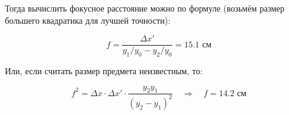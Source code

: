 \documentclass[a4paper,12pt]{article}
\theoremstyle{definition}
\begin{document}
Тогда вычислить фокусное расстояние можно по формуле (возьмём размер большего квадратика для лучшей точности):

\begin{equation*}
    f = \frac{\Delta x'}{y_1/y_0 - y_2/y_0} = 15.1 \text{ см}
\end{equation*}

Или, если считать размер предмета неизвестным, то:

\begin{equation*}
    f^2 = \Delta x \cdot \Delta x' \cdot \frac{y_2y_1}{(y_2-y_1)^2} \quad \Rightarrow \quad f = 14.2 \text{ см}
\end{equation*}

\begin{figure}[H]
	\begin{minipage}[h]{0.5\linewidth}
	\end{minipage}
	\begin{minipage}[h]{0.5\linewidth}
	\end{minipage}
\end{figure}
\end{document}
